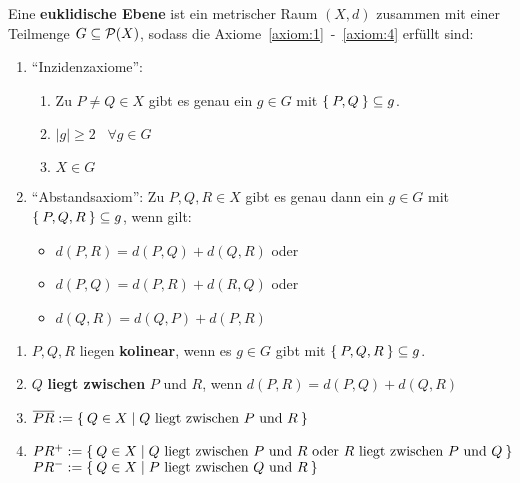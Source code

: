 \begin{definition}%
    Eine \textbf{euklidische Ebene} ist ein metrischer Raum $(X,d)$ 
    zusammen mit einer Teilmenge $G \subseteq \mathcal{P}(X)$, sodass die
    Axiome~\ref{axiom:1}~-~\ref{axiom:4} erfüllt sind:
    \begin{enumerate}[label=§\arabic*),ref=§\arabic*]
        \item \enquote{Inzidenzaxiome}:\label{axiom:1}
            \begin{enumerate}[label=(\roman*),ref=\theenumi{} (\roman*)]
                \item Zu $P \neq Q \in X$ gibt es genau ein $g \in G$ mit
                      $\Set{P, Q} \subseteq g$.
                \item $|g| \geq 2 \;\;\; \forall g \in G$
                \item $X \in G$
            \end{enumerate}
        \item \enquote{Abstandsaxiom}: Zu $P, Q, R \in X$ gibt es \label{axiom:2}
              genau dann ein $g \in G$ mit $\Set{P, Q, R} \subseteq g$,
              wenn gilt: 
              \begin{itemize}[]
                \item $d(P, R) = d(P, Q) + d(Q, R)$ oder
                \item $d(P, Q) = d(P, R) + d(R, Q)$ oder
                \item $d(Q, R) = d(Q, P) + d(P, R)$
              \end{itemize}
    \end{enumerate}
\end{definition}

\begin{definition}
    \begin{enumerate}[label=\alph*)]
        \item $P, Q, R$ liegen \textbf{kolinear}, 
              wenn es $g \in G$ gibt mit $\Set{P, Q, R} \subseteq g$.
        \item $Q$ \textbf{liegt zwischen} $P$
              und $R$, wenn $d(P, R) = d(P, Q) + d(Q, R)$
        \item $\overline{PR} := \Set{Q \in X | Q \text{ liegt zwischen } P \text{ und } R}$
        \item $PR^+ := \Set{Q \in X | Q \text{ liegt zwischen } P \text{ und } R \text{ oder } R \text{ liegt zwischen } P \text{ und } Q}$\\
              $PR^- := \Set{Q \in X | P \text{ liegt zwischen } Q \text{ und } R}$\\ 
    \end{enumerate}
\end{definition}

